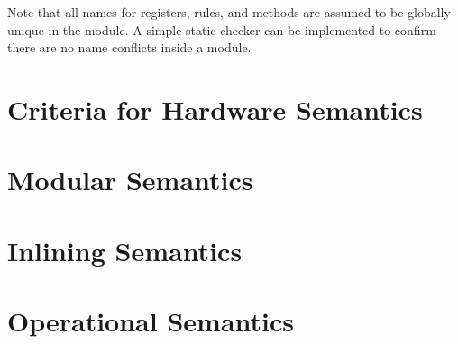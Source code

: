 Note that all names for registers, rules, and methods are assumed to
be globally unique in the module. A simple static checker can be
implemented to confirm there are no name conflicts inside a module.

\section{Criteria for Hardware Semantics} %
\section{Modular Semantics}
\section{Inlining Semantics}
\section{Operational Semantics}
